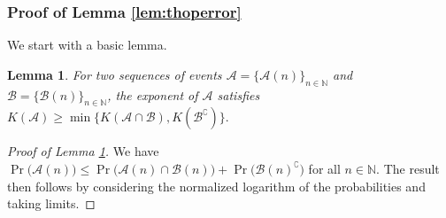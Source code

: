 \documentclass[11pt,onecolumn]{article}
\newcommand{\calA}{\mathcal{A}}
\newcommand{\calB}{\mathcal{B}}
\newcommand{\bbN}{\mathbb{N}}
\newtheorem{lemma}{Lemma}
\begin{document}
\subsubsection{Proof of Lemma \ref{lem:thoperror}}
We start with a basic lemma. 
\begin{lemma}\label{lem:twoseq}
    For two sequences of events $\calA=\big\{\calA(n)\big\}_{n\in\bbN}$ and $\calB=\big\{\calB(n)\big\}_{n\in\bbN}$, the exponent of $\calA$ satisfies
    $
        K ( \calA)\geq \min\{K ( \calA\cap \calB),K (\calB^{\complement})\}.
    $
\end{lemma}
\begin{proof}[Proof of Lemma \ref{lem:twoseq}]
    We have
    $
	    \Pr\big(\calA(n)\big)\le \Pr\big( \calA(n)\cap \calB(n)\big)+\Pr\big(\calB(n)^{\complement}\big)
	$  for all $n\in\bbN$. The result then follows by considering  the normalized logarithm of the probabilities and taking limits. 
\end{proof}
\end{document}
